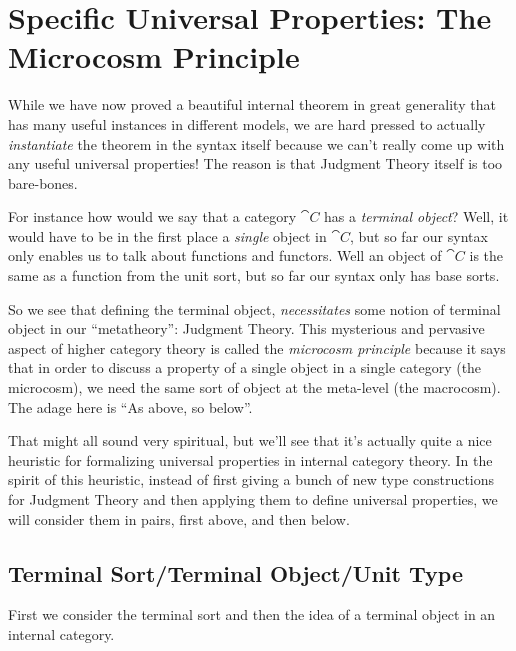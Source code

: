 \documentclass{article}
\begin{document}
\section{Specific Universal Properties: The Microcosm Principle}

While we have now proved a beautiful internal theorem in great
generality that has many useful instances in different models, we are
hard pressed to actually \emph{instantiate} the theorem in the syntax
itself because we can't really come up with any useful universal properties!
The reason is that Judgment Theory itself is too bare-bones.

For instance how would we say that a category $\cat C$ has a
\emph{terminal object}? Well, it would have to be in the first place a
\emph{single} object in $\cat C$, but so far our syntax only enables
us to talk about functions and functors. Well an object of $\cat C$ is
the same as a function from the unit sort, but so far our syntax only
has base sorts.

So we see that defining the terminal object, \emph{necessitates} some
notion of terminal object in our ``metatheory'': Judgment Theory.
This mysterious and pervasive aspect of higher category theory is
called the \emph{microcosm principle} because it says that in order to
discuss a property of a single object in a single category (the
microcosm), we need the same sort of object at the meta-level (the
macrocosm). The adage here is ``As above, so below''.

That might all sound very spiritual, but we'll see that it's actually
quite a nice heuristic for formalizing universal properties in
internal category theory.
%
In the spirit of this heuristic, instead of first giving a bunch of
new type constructions for Judgment Theory and then applying them to
define universal properties, we will consider them in pairs, first
above, and then below.

\subsection{Terminal Sort/Terminal Object/Unit Type}

First we consider the terminal sort and then the idea of a terminal
object in an internal category.
\end{document}
